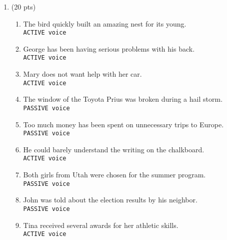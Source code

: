 \documentclass[11pt]{article}
\newcommand{\act}{\texttt{ACTIVE voice}}
\newcommand{\pas}{\texttt{PASSIVE voice}}
\begin{document}
\begin{enumerate}
\begin{enumerate}
\end{enumerate}


\newpage

\item (20 pts) 

\begin{enumerate}

\item The bird quickly built an amazing nest for its young.\\
\act
\vspace*{.5in}

\item George has been having serious problems with his back.\\
\act
\vspace*{.5in}

\item Mary does not want help with her car.\\
\act
\vspace*{.5in}

\item The window of the Toyota Prius was broken during a hail storm.\\
\pas
\vspace*{.5in}

\item Too much money has been spent on unnecessary trips to Europe.\\
\pas
\vspace*{.5in}

\item He could barely understand the writing on the chalkboard.\\
\act
\vspace*{.5in}

\item Both girls from Utah were chosen for the summer program.\\
\pas
\vspace*{.5in}

\item John was told about the election results by his neighbor.\\
\pas
\vspace*{.5in}

\item Tina received several awards for her athletic skills.\\
\act
\vspace*{.5in}


\end{enumerate}
\end{enumerate}
\end{document}
